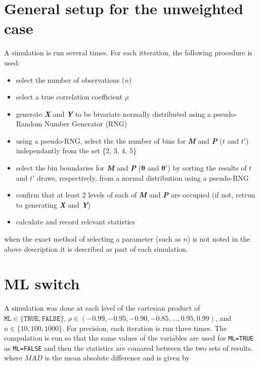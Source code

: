 \documentclass[]{article}
\providecommand{\tightlist}{%
  \setlength{\itemsep}{0pt}\setlength{\parskip}{0pt}}
\begin{document}
\section{General setup for the unweighted
case}\label{general-setup-for-the-unweighted-case}

A simulation is run several times. For each itteration, the following
procedure is used:

\begin{itemize}
\tightlist
\item
  select the number of observations (\(n\))
\item
  select a true correlation coefficient \(\rho\)
\item
  generate \textbf{\emph{X}} and \textbf{\emph{Y}} to be bivariate
  normally distributed using a pseudo-Random Number Generator (RNG)
\item
  using a pseudo-RNG, select the the number of bins for
  \textbf{\emph{M}} and \textbf{\emph{P}} (\(t\) and \(t'\))
  independantly from the set \{2, 3, 4, 5\}
\item
  select the bin boundaries for \textbf{\emph{M}} and \textbf{\emph{P}}
  (\(\boldsymbol{\theta}\) and \(\boldsymbol{\theta}'\)) by sorting the
  results of \(t\) and \(t'\) draws, respectively, from a normal
  distribution using a pseudo-RNG
\item
  confirm that at least 2 levels of each of \textbf{\emph{M}} and
  \textbf{\emph{P}} are occupied (if not, retrun to generating
  \textbf{\emph{X}} and \textbf{\emph{Y}})
\item
  calculate and record relevant statistics
\end{itemize}

when the exact method of selecting a parameter (such as \(n\)) is not
noted in the above description it is described as part of each
simulation.

\section{ML switch}\label{ml-switch}

A simulation was done at each level of the cartesian product of
\(\mathtt{ML} \in \{\mathtt{TRUE}, \mathtt{FALSE} \}\),
\(\rho \in \left( -0.99, -0.95, -0.90, -0.85, ..., 0.95, 0.99 \right)\),
and \(n \in \{10, 100, 1000\}\). For precision, each iteration is run
three times. The compulation is run so that the same values of the
variables are used for \texttt{ML=TRUE} as \texttt{ML=FALSE} and then
the statistics are comared between the two sets of results. where
\(MAD\) is the mean absolute difference and is given by
\end{document}
